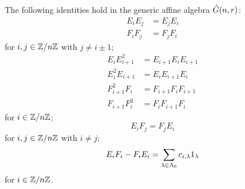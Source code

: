 \documentclass[a4paper, 11pt, twoside]{report}
\begin{document}
\begin{lemma}\label{lemma:generic-algebra-relations}
The following identities hold in the generic affine algebra $\hat{G}(n,r)$:
\begin{align*}
E_iE_j&=E_jE_i\\
F_iF_j&=F_jF_i
\end{align*}
for $i,j\in\mathbb{Z}/{n \mathbb{Z}}$ with $j\neq i\pm 1$;
\begin{align*}
E_iE_{i+1}^2 &= E_{i+1}E_iE_{i+1}\\
E_i^2E_{i+1} &= E_iE_{i+1}E_i\\
F_{i+1}^2F_i &= F_{i+1}F_iF_{i+1}\\
F_{i+1}F_i^2 &= F_iF_{i+1}F_i
\end{align*}
for $i\in\mathbb{Z}/{n \mathbb{Z}}$;
\begin{equation*}
E_iF_j=F_jE_i
\end{equation*}
for $i,j\in\mathbb{Z}/{n \mathbb{Z}}$ with $i\neq j$;
\begin{equation*}
E_iF_i-F_iE_i = \sum_{\lambda\in\Lambda_0{}} c_{i,\lambda}1_\lambda
\end{equation*}
for $i\in\mathbb{Z}/{n \mathbb{Z}}$.
\end{lemma}
\end{document}
